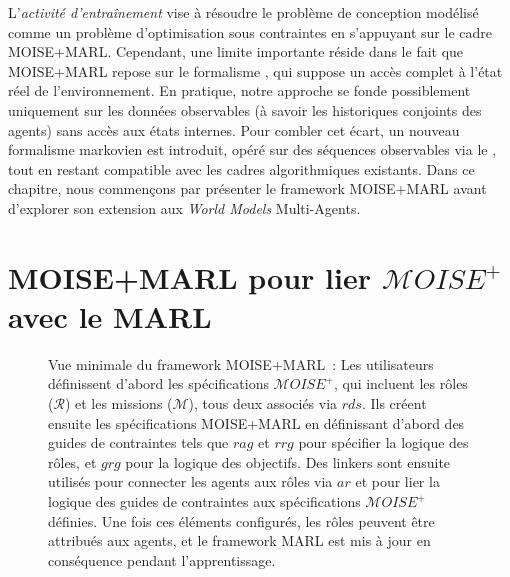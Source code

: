 L'\textit{activité d'entraînement} vise à résoudre le problème de conception modélisé comme un problème d'optimisation sous contraintes en s'appuyant sur le cadre MOISE+MARL. Cependant, une limite importante réside dans le fait que MOISE+MARL repose sur le formalisme , qui suppose un accès complet à l'état réel de l'environnement. En pratique, notre approche se fonde possiblement uniquement sur les données observables (à savoir les historiques conjoints des agents) sans accès aux états internes. Pour combler cet écart, un nouveau formalisme markovien est introduit, opéré sur des séquences observables via le , tout en restant compatible avec les cadres algorithmiques  existants.
Dans ce chapitre, nous commençons par présenter le framework MOISE+MARL avant d'explorer son extension aux \textit{World Models} Multi-Agents.


\section{MOISE+MARL pour lier $\mathcal{M}OISE^+$ avec le MARL}

\begin{figure}[h!]
  \centering
  
  \caption[Vue minimale du framework MOISE+MARL]{Vue minimale du framework MOISE+MARL~: Les utilisateurs définissent d'abord les spécifications $\mathcal{M}OISE^+$, qui incluent les rôles ($\mathcal{R}$) et les missions ($\mathcal{M}$), tous deux associés via $rds$. Ils créent ensuite les spécifications MOISE+MARL en définissant d'abord des guides de contraintes tels que $rag$ et $rrg$ pour spécifier la logique des rôles, et $grg$ pour la logique des objectifs. Des linkers sont ensuite utilisés pour connecter les agents aux rôles via $ar$ et pour lier la logique des guides de contraintes aux spécifications $\mathcal{M}OISE^+$ définies. Une fois ces éléments configurés, les rôles peuvent être attribués aux agents, et le framework MARL est mis à jour en conséquence pendant l'apprentissage.
  }
  \label{fig:mm_synthesis}
\end{figure}


